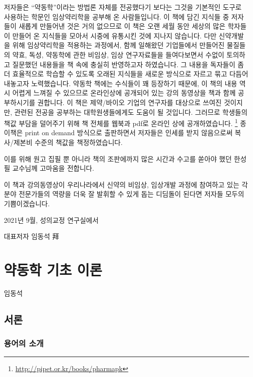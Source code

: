 \documentclass[
  11pt,
  krantz2, a4paper, twoside]{krantz}
\theoremstyle{definition}
\theoremstyle{definition}
\theoremstyle{definition}
\theoremstyle{definition}
\theoremstyle{remark}
\begin{document}
저자들은 ``약동학''이라는 방법론 자체를 전공했다기 보다는 그것을 기본적인
도구로 사용하는 학문인 임상약리학을 공부해 온 사람들입니다. 이 책에 담긴
지식들 중 저자들이 새롭게 만들어낸 것은 거의 없으므로 이 책은 오랜 세월
동안 세상의 많은 학자들이 만들어 온 지식들을 모아서 시중에 유통시킨 것에
지나지 않습니다. 다만 신약개발을 위해 임상약리학을 적용하는 과정에서,
함께 일해왔던 기업들에서 만들어진 물질들의 약효, 독성, 약동학에 관한
비임상, 임상 연구자료들을 들여다보면서 수없이 토의하고 질문했던 내용들을
책 속에 충실히 반영하고자 하였습니다. 그 내용을 독자들이 좀 더
효율적으로 학습할 수 있도록 오래된 지식들을 새로운 방식으로 자르고 묶고
다듬어 내놓고자 노력했습니다. 약동학 책에는 수식들이 꽤 등장하기 때문에, 이 책의 내용 역시 어렵게 느껴질 수 있으므로 온라인상에 공개되어 있는 강의 동영상을 책과 함께 공부하시기를 권합니다.
이 책은 제약/바이오 기업의 연구자를 대상으로 쓰여진 것이지만, 관련된 전공을 공부하는 대학원생들에게도 도움이 될 것입니다.
그러므로 학생들의 책값 부담을 덜어주기 위해 책 전체를 웹북과 pdf로 온라인 상에 공개하였습니다. \footnote{\url{http://pipet.or.kr/books/pharmapk}}
종이책은 print on demand 방식으로 출판하면서 저자들은 인세를 받지 않음으로써 복사/제본비 수준의 책값을 책정하였습니다.

이를 위해 원고 집필 뿐 아니라 책의 조판에까지 많은 시간과 수고를 쏟아야 했던 한성필 교수님께 고마움을 전합니다.

이 책과 강의동영상이 우리나라에서 신약의 비임상, 임상개발 과정에 참여하고 있는 각 분야 전문가들의 역량을 더욱 잘 발휘할 수 있게 돕는 디딤돌이 된다면 저자들 모두의 기쁨이겠습니다.

\hfill 2021년 9월, 성의교정 연구실에서

\hfill 대표저자 임동석 拜

\normalsize

\mainmatter

\hypertarget{principle}{%
\chapter{약동학 기초 이론}\label{principle}}

\Large\hfill

임동석
\normalsize

\hypertarget{uxc11cuxb860}{%
\section{서론}\label{uxc11cuxb860}}

\hypertarget{uxc6a9uxc5b4uxc758-uxc18cuxac1c}{%
\subsection{용어의 소개}\label{uxc6a9uxc5b4uxc758-uxc18cuxac1c}}
\end{document}
